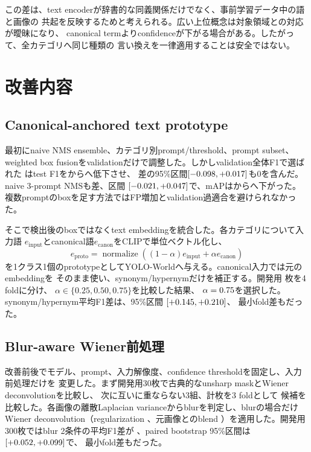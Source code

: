\documentclass[lualatex,ja=standard,a4paper,10pt]{bxjsarticle}
\newcommand{\code}[1]{\texttt{#1}}
\begin{document}
この差は、text encoderが辞書的な同義関係だけでなく、事前学習データ中の語と画像の
共起を反映するためと考えられる。広い上位概念は対象領域との対応が曖昧になり、
canonical termよりconfidenceが下がる場合がある。したがって、全カテゴリへ同じ種類の
言い換えを一律適用することは安全ではない。

\section{改善内容}

\subsection{Canonical-anchored text prototype}

最初にnaive NMS ensemble、カテゴリ別prompt/threshold、prompt subset、weighted box
fusionをvalidationだけで調整した。しかしvalidation全体F1で選ばれた
\code{\PrimaryStrategy}はtest F1を\BaselineFOne から\PrimaryFOne へ低下させ、
差\PrimaryDelta の95\%区間$[-0.098,+0.017]$も0を含んだ。
naive 3-prompt NMSも差\NaiveDelta、区間
$[-0.021,+0.047]$で、mAPは\BaselineAP から\NaiveAP へ下がった。
複数promptのboxを足す方法ではFP増加とvalidation過適合を避けられなかった。

そこで検出後のboxではなくtext embeddingを統合した。各カテゴリについて入力語
$e_{\mathrm{input}}$とcanonical語$e_{\mathrm{canon}}$をCLIPで単位ベクトル化し、
\[
e_{\mathrm{proto}} =
\operatorname{normalize}\left(
(1-\alpha)e_{\mathrm{input}}+\alpha e_{\mathrm{canon}}
\right)
\]
を1クラス1個のprototypeとしてYOLO-Worldへ与える。canonical入力では元のembeddingを
そのまま使い、synonym/hypernymだけを補正する。開発用
\PromptPrototypeDevelopmentImageCount 枚を4 foldに分け、
$\alpha\in\{0.25,0.50,0.75\}$を比較した結果、
$\alpha=0.75$を選択した。
synonym/hypernym平均F1差は\PromptPrototypeDevelopmentFOneDelta、95\%区間
$[+0.145,+0.210]$、
最小fold差も\PromptPrototypeMinimumFoldGain だった。

\subsection{Blur-aware Wiener前処理}

改善前後でモデル、prompt、入力解像度、confidence thresholdを固定し、入力前処理だけを
変更した。まず開発用30枚で古典的なunsharp maskとWiener deconvolutionを比較し、
次に互いに重ならない3組、計\SameModelDevelopmentImageCount 枚を3 foldとして
候補を比較した。各画像の離散Laplacian varianceからblurを判定し、blurの場合だけ
Wiener deconvolution（regularization \WienerRegularization、元画像とのblend
\WienerBlend）を適用した。開発用300枚ではblur 2条件の平均F1差が
\SameModelDevelopmentFOneDelta、paired bootstrap 95\%区間は
$[+0.052,+0.099]$で、
最小fold差も\SameModelMinimumFoldGain だった。
\end{document}
